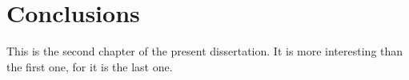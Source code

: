 \chapter{Conclusions}
This is the second chapter of the present dissertation. It is more interesting than the first one, for it is the last one.